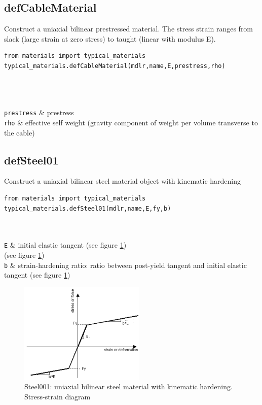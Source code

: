 \subsection{defCableMaterial}
\noindent Construct a uniaxial bilinear prestressed material. The stress strain ranges from slack (large strain at zero stress) to taught (linear with modulus E).
\begin{verbatim}
from materials import typical_materials
typical_materials.defCableMaterial(mdlr,name,E,prestress,rho)
\end{verbatim}
\begin{paramFuncTable}
\mdlr{} \\
 \\
\E{} \\
{\tt prestress} & prestress \\
{\tt rho} & effective self weight (gravity component of weight per volume transverse to the cable) \\
\end{paramFuncTable}


\subsection{defSteel01}
\noindent Construct a uniaxial bilinear steel material object with kinematic hardening
\begin{verbatim}
from materials import typical_materials
typical_materials.defSteel01(mdlr,name,E,fy,b)
\end{verbatim}
\begin{paramFuncTable}
\mdlr{} \\
 \\
{\tt E} & initial elastic tangent (see figure \ref{Steel01}) \\
\fy{} (see figure \ref{Steel01})\\
{\tt b} &  strain-hardening ratio: ratio between post-yield tangent and initial elastic tangent (see figure \ref{Steel01})\\
\end{paramFuncTable}


\begin{figure}[h]
\centering
\includegraphics[width=60mm]{materials/figures/Steel01}
\caption{Steel001: uniaxial bilinear steel material with kinematic hardening. Stress-strain diagram}\label{Steel01}
\end{figure}



